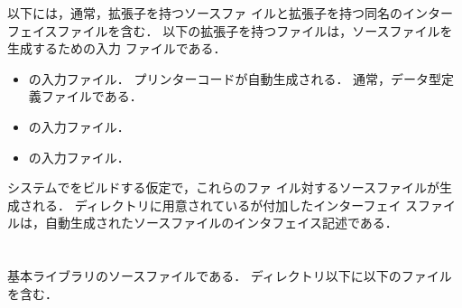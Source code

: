 	以下には，通常，拡張子を持つソースファ
イルと拡張子を持つ同名のインターフェイスファイルを含む．
	以下の拡張子を持つファイルは，ソースファイルを生成するための入力
ファイルである．
\begin{itemize}
\item {} の入力ファイル．
	プリンターコードが自動生成される．
	通常，データ型定義ファイルである．
\item {} の入力ファイル．
\item {} の入力ファイル．
\end{itemize}
	システムで\smlsharp{}をビルドする仮定で，これらのファ
イル対するソースファイルが生成される．
	ディレクトリに用意されているが付加したインターフェイ
スファイルは，自動生成されたソースファイルのインタフェイス記述である．
\fi%

\section{}
\ifjp%
	基本ライブラリのソースファイルである．
	ディレクトリ以下に以下のファイルを含む．

